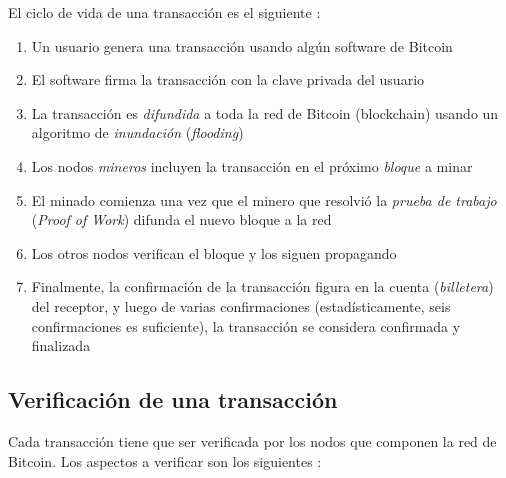 El ciclo de vida de una transacción es el siguiente \autocite{MasteringBlockchainTransactionsLifeCycle}:

\begin{enumerate}
    \item Un usuario genera una transacción usando algún software de Bitcoin
    \item El software firma la transacción con la clave privada del usuario
    \item La transacción es \emph{difundida} a toda la red de Bitcoin (blockchain) usando un algoritmo de \emph{inundación} (\emph{flooding})  
    \item Los nodos \emph{mineros} incluyen la transacción en el próximo \emph{bloque} a minar
    \item El minado comienza una vez que el minero que resolvió la \emph{prueba de trabajo} (\emph{Proof of Work}) difunda el nuevo bloque a la red
    \item Los otros nodos verifican el bloque y los siguen propagando
    \item Finalmente, la confirmación de la transacción figura en la cuenta (\emph{billetera}) del receptor, y luego de varias confirmaciones (estadísticamente, seis confirmaciones es suficiente), la transacción se considera confirmada y finalizada
\end{enumerate}

\subsection{Verificación de una transacción}

Cada transacción tiene que ser verificada por los nodos que componen la red de Bitcoin. Los aspectos a verificar son los siguientes \autocite{MasteringBlockchainVerification}:

